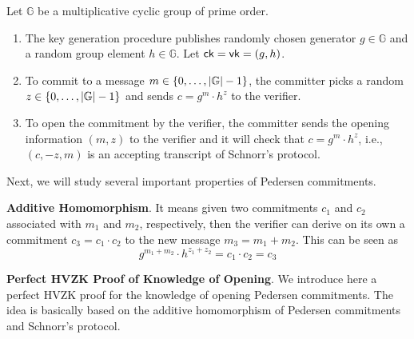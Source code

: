 \documentclass{article}
\begin{document}
\begin{boxx1} \label{def:pedersen-commitments}
Let $\mathbb{G}$ be a multiplicative cyclic group of prime order. 
\begin{enumerate}
\item\label{item:39} The key generation procedure publishes randomly chosen generator $g \in \mathbb{G}$ and a random group element $h \in \mathbb{G}$. Let $\text{\textsf{ck}} = \text{\textsf{vk}} = (g, h)$. 
\item\label{item:40} To commit to a message $m \in \left\{ 0, \dots, \abs{\mathbb{G}} - 1 \right\}$, the committer picks a random $z \in \left\{ 0, \dots, \abs{\mathbb{G}} - 1 \right\}$ and sends $c = g^m \cdot h^z$ to the verifier. 
\item\label{item:41} To open the commitment by the verifier, the committer sends the opening information $(m, z)$ to the verifier and it will check that $c = g^m \cdot h^z$, i.e., $(c, -z, m)$ is an accepting transcript of Schnorr's protocol. 
\end{enumerate}
\end{boxx1}

Next, we will study several important properties of Pedersen commitments.

\textbf{Additive Homomorphism}. It means given two commitments $c_1$ and $c_2$ associated with $m_1$ and $m_2$, respectively, then the verifier can derive on its own a commitment $c_3 = c_1 \cdot c_2$ to the new message $m_3 = m_1 + m_2$. This can be seen as
\begin{equation*}
g^{m_1 + m_2} \cdot h^{z_{1} + z_{2}}  = c_1 \cdot c_2 = c_3
\end{equation*}

\textbf{Perfect HVZK Proof of Knowledge of Opening}. We introduce here a perfect HVZK proof for the knowledge of opening Pedersen commitments. The idea is basically based on the additive homomorphism of Pedersen commitments and Schnorr's protocol.
\end{document}
